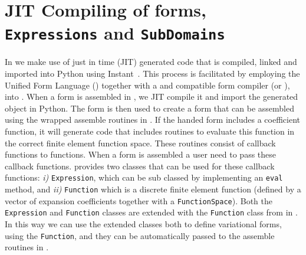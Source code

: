 \section{JIT Compiling of \ufl forms, \texttt{Expressions} and \texttt{SubDomains}}
In \pydolfin we make use of just in time (JIT) generated \ufc code that is compiled, linked and imported into Python using Instant~\cite{WestlieMardalAlnaes2009}. This process is facilitated by employing the Unified Form Language (\ufl) together with a \ufl and \ufc compatible form compiler (\ffc or \sfc), into \pydolfin. When a \ufl form is assembled in \pydolfin, we JIT compile it and import the generated \ufc object in Python. The \ufc form is then used to create a \dolfin form that can be assembled using the \swig wrapped assemble routines in \dolfin. If the handed \ufl form includes a coefficient function, it will generate \ufc code that includes routines to evaluate this function in the correct finite element function space. These routines consist of callback functions to \ufc functions. When a \ufc form is assembled a user need to pass these callback functions. \dolfin provides two classes that can be used for these callback functions: \textit{i)} \texttt{Expression}, which can be sub classed by implementing an \texttt{eval} method, and \textit{ii)} \texttt{Function} which is a discrete finite element function (defined by a vector of expansion coefficients together with a \texttt{FunctionSpace}). Both the \texttt{Expression} and \texttt{Function} classes are extended with the \texttt{Function} class from \ufl in \pydolfin. In this way we can use the extended classes both to define variational forms, using the \ufl \texttt{Function}, and they can be automatically passed to the assemble routines in \dolfin. \par

